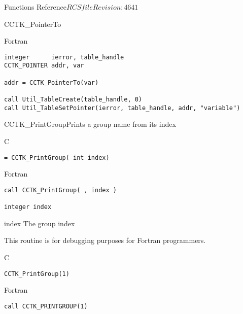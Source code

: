 \begin{cactuspart}{ Functions Reference}{$RCSfile$}{$Revision: 4641 $}
\begin{FunctionDescription}{CCTK\_PointerTo}
\begin{ExampleSection}
\begin{Example}{Fortran}
\begin{verbatim}
integer      ierror, table_handle
CCTK_POINTER addr, var

addr = CCTK_PointerTo(var)

call Util_TableCreate(table_handle, 0)
call Util_TableSetPointer(ierror, table_handle, addr, "variable")
\end{verbatim}
\end{Example}
\end{ExampleSection}
\end{FunctionDescription}


\begin{FunctionDescription}{CCTK\_PrintGroup}{Prints a group name from its index}
\label{CCTK-PrintGroup}
\begin{SynopsisSection}
\begin{Synopsis}{C}
\begin{verbatim}= CCTK_PrintGroup( int index)\end{verbatim}
\end{Synopsis}
\begin{Synopsis}{Fortran}
\begin{verbatim}call CCTK_PrintGroup( , index )

integer index\end{verbatim}
\end{Synopsis}
\end{SynopsisSection}
\begin{ParameterSection}
\begin{Parameter}{index}
The group index
\end{Parameter}
\end{ParameterSection}
\begin{Discussion}
This routine is for debugging purposes for Fortran programmers.
\end{Discussion}
\begin{ExampleSection}
\begin{Example}{C}
\begin{verbatim}
CCTK_PrintGroup(1)
\end{verbatim}
\end{Example}
\begin{Example}{Fortran}
\begin{verbatim}
call CCTK_PRINTGROUP(1)
\end{verbatim}
\end{Example}
\end{ExampleSection}
\end{FunctionDescription}


\end{cactuspart}
